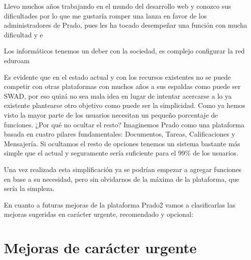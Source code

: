 Llevo muchos años trabajando en el mundo del desarrollo web y conozco sus dificultades por lo que me gustaría romper una lanza en favor de los administradores de Prado, pues  les ha tocado desempeñar una función con mucha dificultad y e


Los informáticos tenemos un deber con la sociedad, es complejo configurar la red eduroam


Es evidente que en el estado actual y con los recursos existentes no se puede competir con otras plataformas con muchos años a sus espaldas como puede ser SWAD, por eso quizá no sea mala idea en lugar de intentar acercarse a lo ya existente plantearse otro objetivo como puede ser la simplicidad. Como ya hemos visto la mayor parte de los usuarios necesitan un pequeño porcentaje de funciones. ¿Por qué no ocultar el resto? Imaginemos Prado como una plataforma basada en cuatro pilares fundamentales: Documentos, Tareas, Calificaciones y Mensajería. Si ocultamos el resto de opciones tenemos un sistema bastante más simple que el actual y seguramente sería suficiente para el 99\% de los usuarios.

Una vez realizada esta simplificación ya se podrían empezar a agregar funciones en base a su necesidad, pero sin olvidarnos de la máxima de la plataforma, que sería la simpleza. 






\newpage
En cuanto a futuras mejoras de la plataforma Prado2 vamos a clasificarlas las mejoras sugeridas en carácter urgente, recomendado y opcional:

\section{Mejoras de carácter urgente}

